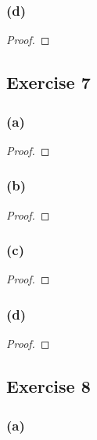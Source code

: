 \documentclass[14pt]{extarticle}
\begin{document}
\subsubsection{(d)}

\begin{proof}

\end{proof}

\subsection{Exercise 7}

\subsubsection{(a)}

\begin{proof}

\end{proof}

\subsubsection{(b)}

\begin{proof}

\end{proof}

\subsubsection{(c)}

\begin{proof}

\end{proof}

\subsubsection{(d)}

\begin{proof}

\end{proof}

\subsection{Exercise 8}

\subsubsection{(a)}
\end{document}

